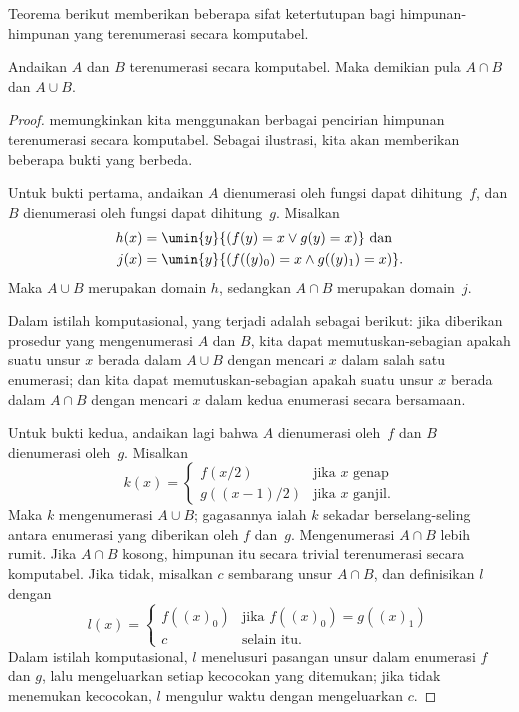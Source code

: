 \documentclass[../../../include/open-logic-section]{subfiles}
\begin{document}


Teorema berikut memberikan beberapa sifat ketertutupan bagi himpunan-himpunan
yang terenumerasi secara komputabel.

\begin{thm}
Andaikan $A$ dan $B$ terenumerasi secara komputabel. Maka demikian pula
$A \cap B$ dan $A \cup B$.
\end{thm}

\begin{proof}
 memungkinkan kita menggunakan berbagai pencirian
himpunan terenumerasi secara komputabel. Sebagai ilustrasi, kita akan
memberikan beberapa bukti yang berbeda.

Untuk bukti pertama, andaikan $A$ dienumerasi oleh fungsi dapat dihitung~$f$,
dan $B$ dienumerasi oleh fungsi dapat dihitung~$g$. Misalkan
\begin{align*}
h(x) & = \umin{y}{(f(y) = x \lor g(y) = x)} \text{ dan}\\
j(x) & = \umin{y}{(f((y)_0) = x \land g((y)_1) = x)}.
\end{align*}
Maka $A \cup B$ merupakan domain $h$, sedangkan $A \cap B$ merupakan
domain~$j$.

\begin{explain}
Dalam istilah komputasional, yang terjadi adalah sebagai berikut: jika
diberikan prosedur yang mengenumerasi $A$ dan $B$, kita dapat memutuskan-sebagian
apakah suatu unsur $x$ berada dalam $A \cup B$ dengan mencari $x$ dalam salah
satu enumerasi; dan kita dapat memutuskan-sebagian apakah suatu unsur $x$
berada dalam $A \cap B$ dengan mencari $x$ dalam kedua enumerasi secara
bersamaan.
\end{explain}

Untuk bukti kedua, andaikan lagi bahwa $A$ dienumerasi oleh~$f$ dan $B$
dienumerasi oleh~$g$. Misalkan
\[
k(x) = \begin{cases}
f(x/2) & \text{jika $x$ genap} \\
g((x-1)/2) & \text{jika $x$ ganjil.}
\end{cases}
\]
Maka $k$ mengenumerasi $A \cup B$; gagasannya ialah $k$ sekadar berselang-seling
antara enumerasi yang diberikan oleh $f$ dan~$g$. Mengenumerasi $A \cap B$
lebih rumit. Jika $A \cap B$ kosong, himpunan itu secara trivial terenumerasi
secara komputabel. Jika tidak, misalkan $c$ sembarang unsur $A \cap B$, dan
definisikan $l$ dengan
\[
l(x) = \begin{cases}
f((x)_0) & \text{jika $f((x)_0) = g((x)_1)$} \\
c & \text{selain itu.}
\end{cases}
\]
Dalam istilah komputasional, $l$ menelusuri pasangan unsur dalam enumerasi
$f$ dan $g$, lalu mengeluarkan setiap kecocokan yang ditemukan; jika tidak
menemukan kecocokan, $l$ mengulur waktu dengan mengeluarkan $c$.


\end{proof}
\end{document}

